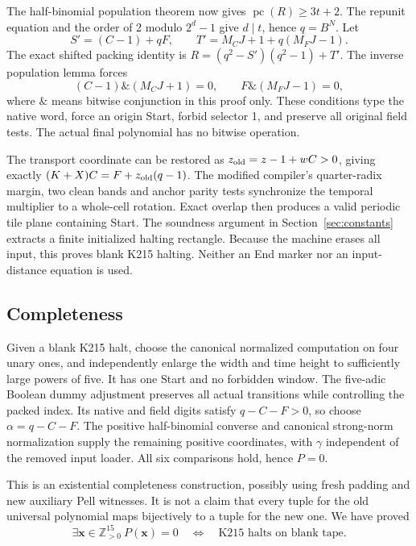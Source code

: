 \documentclass[11pt]{article}
\newcommand{\Pos}{\mathbb Z_{>0}}
\newcommand{\pc}{\operatorname{pc}}
\begin{document}
The half-binomial population theorem now gives
\(\pc(R)\ge3t+2\). The repunit equation and the order of 2 modulo \(2^d-1\) give \(d\mid t\), hence \(q=B^N\). Let
\[
 S'=(C-1)+qF,\qquad T'=M_CJ+1+q(M_FJ-1).
\]
The exact shifted packing identity is
\(R=(q^2-S')(q^2-1)+T'\). The inverse population lemma forces
\[
 (C-1)\mathbin{\&}(M_CJ+1)=0,\qquad
 F\mathbin{\&}(M_FJ-1)=0,
\]
where \(\&\) means bitwise conjunction in this proof only. These conditions type the native word, force an origin Start, forbid selector 1, and preserve all original field tests. The actual final polynomial has no bitwise operation.

The transport coordinate can be restored as
\(z_{\rm old}=z-1+wC>0\), giving exactly
\((K+X)C=F+z_{\rm old}(q-1)\).
The modified compiler's quarter-radix margin, two clean bands and anchor parity tests synchronize the temporal multiplier to a whole-cell rotation. Exact overlap then produces a valid periodic tile plane containing Start. The soundness argument in Section~\ref{sec:constants} extracts a finite initialized halting rectangle. Because the machine erases all input, this proves blank K215 halting. Neither an End marker nor an input-distance equation is used.

\subsection{Completeness}
Given a blank K215 halt, choose the canonical normalized computation on four unary ones, and independently enlarge the width and time height to sufficiently large powers of five. It has one Start and no forbidden window. The five-adic Boolean dummy adjustment preserves all actual transitions while controlling the packed index. Its native and field digits satisfy \(q-C-F>0\), so choose \(\alpha=q-C-F\). The positive half-binomial converse and canonical strong-norm normalization supply the remaining positive coordinates, with \(\gamma\) independent of the removed input loader. All six comparisons hold, hence \(P=0\).

This is an existential completeness construction, possibly using fresh padding and new auxiliary Pell witnesses. It is not a claim that every tuple for the old universal polynomial maps bijectively to a tuple for the new one. We have proved
\begin{equation}\label{eq:machine_equiv}
 \exists\mathbf x\in\Pos^{15}\ P(\mathbf x)=0
 \quad\Longleftrightarrow\quad\text{K215 halts on blank tape}.
\end{equation}
\end{document}

